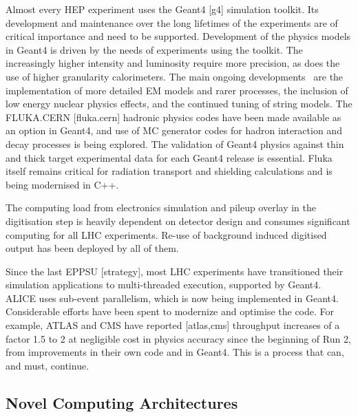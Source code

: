 \documentclass[10pt,a4paper]{article}
\begin{document}
Almost every HEP experiment uses the Geant4 {[}g4{]} simulation toolkit.
Its development and maintenance over the long lifetimes of the
experiments are of critical importance and need to be supported.
Development of the physics models in Geant4 is driven by the needs of
experiments using the toolkit. The increasingly higher intensity and
luminosity require more precision, as does the use of higher granularity
calorimeters. The main ongoing
developments~\cite{g4inputs} are the
implementation of more detailed EM models and rarer processes, the
inclusion of low energy nuclear physics effects, and the continued
tuning of string models. The FLUKA.CERN {[}fluka.cern{]} hadronic
physics codes have been made available as an option in Geant4, and use
of MC generator codes for hadron interaction and decay processes is
being explored. The validation of Geant4 physics against thin and thick
target experimental data for each Geant4 release is essential. Fluka
itself remains critical for radiation transport and shielding
calculations and is being modernised in C++.

The computing load from electronics simulation and pileup overlay in the
digitisation step is heavily dependent on detector design and consumes
significant computing for all LHC experiments. Re-use of background
induced digitised output has been deployed by all of them.

Since the last EPPSU {[}strategy{]}, most LHC experiments have
transitioned their simulation applications to multi-threaded execution,
supported by Geant4. ALICE uses sub-event parallelism, which is now
being implemented in Geant4. Considerable efforts have been spent to
modernize and optimise the code. For example, ATLAS and CMS have
reported {[}atlas,cms{]} throughput increases of a factor 1.5 to 2 at
negligible cost in physics accuracy since the beginning of Run 2, from
improvements in their own code and in Geant4. This is a process that
can, and must, continue.

\subsection{Novel Computing
Architectures}\label{novel-computing-architectures}
\end{document}

